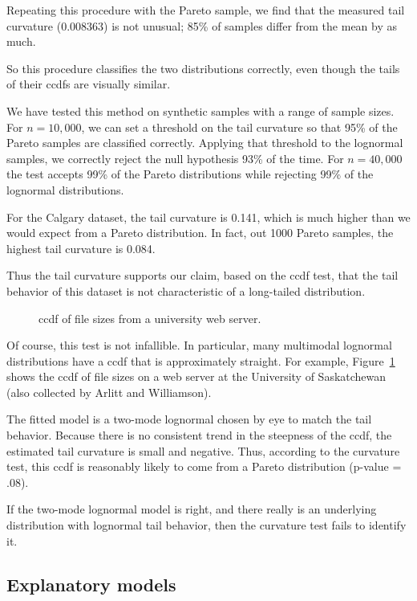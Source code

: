 \documentclass[twocolumn,11pt]{infocom}
\begin{document}
Repeating this procedure with the Pareto sample, we find that the
measured tail curvature (0.008363) is not unusual; 85\% of samples
differ from the mean by as much.

So this procedure classifies the two distributions correctly, even
though the tails of their ccdfs are visually similar.

We have tested this method on synthetic samples with a range
of sample sizes.  For $n = 10,000$, we can set a threshold
on the tail curvature so that 95\% of the Pareto samples are
classified correctly.  Applying that threshold to the
lognormal samples, we correctly reject the null hypothesis
93\% of the time.  For $n=40,000$ the test accepts 99\% of the
Pareto distributions while rejecting 99\% of the lognormal
distributions.

For the Calgary dataset, the tail curvature is 0.141, which is much
higher than we would expect from a Pareto distribution.  In fact, out
1000 Pareto samples, the highest tail curvature is
0.084.

Thus the tail curvature supports our claim, based on the ccdf
test, that the tail behavior of this dataset is not characteristic of
a long-tailed distribution.

\begin{figure}[tb]
\centerline{}
\caption{ccdf of file sizes from a university web server.}
\label{fig.usask}
\end{figure}

Of course, this test is not infallible.  In particular,
many multimodal lognormal distributions have a ccdf that
is approximately straight.  For example, Figure~\ref{fig.usask}
shows the ccdf of file sizes on a web server at the University
of Saskatchewan (also collected by Arlitt and Williamson).

The fitted model is a two-mode lognormal chosen by eye to match the
tail behavior.  Because there is no consistent trend in the steepness
of the ccdf, the estimated tail curvature is small and negative.
Thus, according to the curvature test, this ccdf is reasonably likely
to come from a Pareto distribution (p-value = .08).

If the two-mode lognormal model is right, and there really is an
underlying distribution with lognormal tail behavior, then the
curvature test fails to identify it.


\subsection {Explanatory models}
\end{document}
